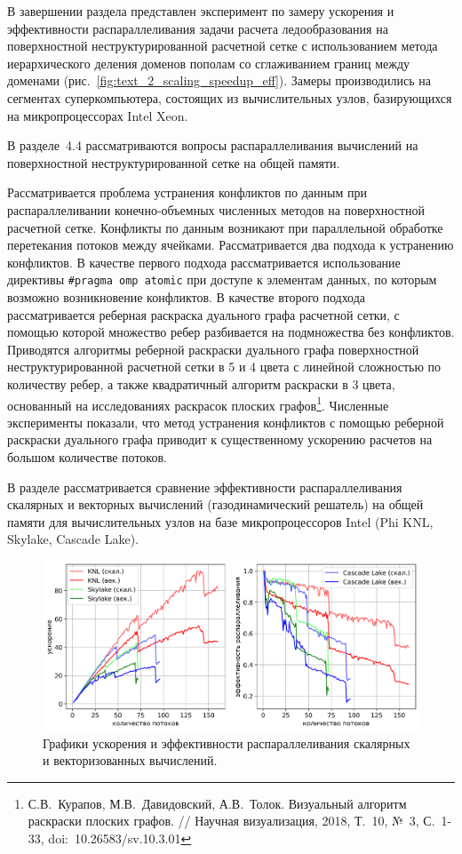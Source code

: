 \documentclass[a4paper,14pt]{extarticle}                     %
\theoremstyle{plain}                                         %
\begin{document}
В завершении раздела представлен эксперимент по замеру ускорения и эффективности распараллеливания задачи расчета ледообразования на поверхностной неструктурированной расчетной сетке с использованием метода иерархического деления доменов пополам со сглаживанием границ между доменами (рис.~\ref{fig:text_2_scaling_speedup_eff}).
Замеры производились на сегментах суперкомпьютера, состоящих из вычислительных узлов, базирующихся на микропроцессорах Intel Xeon.


\newpage
В разделе~4.4 рассматриваются вопросы распараллеливания вычислений на поверхностной неструктурированной сетке на общей памяти.

Рассматривается проблема устранения конфликтов по данным при распараллеливании конечно-объемных численных методов на поверхностной расчетной сетке.
Конфликты по данным возникают при параллельной обработке перетекания потоков между ячейками.
Рассматривается два подхода к устранению конфликтов.
В качестве первого подхода рассматривается использование директивы \texttt{\#pragma omp atomic} при доступе к элементам данных, по которым возможно возникновение конфликтов.
В качестве второго подхода рассматривается реберная раскраска дуального графа расчетной сетки, с помощью которой множество ребер разбивается на подмножества без конфликтов.
Приводятся алгоритмы реберной раскраски дуального графа поверхностной неструктурированной расчетной сетки в 5 и 4 цвета с линейной сложностью по количеству ребер, а также квадратичный алгоритм раскраски в 3 цвета, основанный на исследованиях раскрасок плоских графов\footnote[2]{С.В.~Курапов, М.В.~Давидовский, А.В.~Толок. Визуальный алгоритм раскраски плоских графов. // Научная визуализация, 2018, Т.~10, №~3, С.~1-33, doi:~10.26583/sv.10.3.01}.
Численные эксперименты показали, что метод устранения конфликтов с помощью реберной раскраски дуального графа приводит к существенному ускорению расчетов на большом количестве потоков.

В разделе рассматривается сравнение эффективности распараллеливания скалярных и векторных вычислений (газодинамический решатель) на общей памяти для вычислительных узлов на базе микропроцессоров Intel (Phi KNL, Skylake, Cascade Lake).

\begin{figure}[ht]
\centering
\includegraphics[width=1.0\textwidth]{./fig/par_openmp_scalar_vec_chart_big.png}
\singlespacing
\caption{Графики ускорения и эффективности распараллеливания скалярных и векторизованных вычислений.}
\label{fig:text_3_omp2}
\end{figure}
\end{document}
